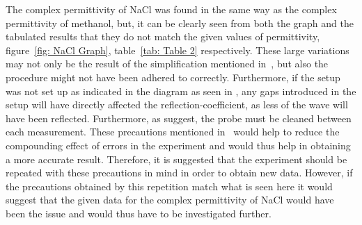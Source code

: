\documentclass[12pt, a4paper]{article}
\begin{document}
\begin{multicols*}{2}
The complex permittivity of NaCl was found in the same way as the complex permittivity of methanol, but, it can be clearly seen from both the graph and the tabulated results that they do not match the given values of permittivity, figure~\ref{fig: NaCl Graph}, table~\ref{tab: Table 2} respectively. These large variations may not only be the result of the simplification mentioned in~\cite{marsland1987dielectric}, but also the procedure might not have been adhered to correctly. Furthermore, if the setup was not set up as indicated in the diagram as seen in \cite{marsland1987dielectric}, any gaps introduced in the setup will have directly affected the reflection-coefficient, as less of the wave will have been reflected. Furthermore, as \cite{marsland1987dielectric} suggest, the probe must be cleaned between each measurement. These precautions mentioned in~\cite{marsland1987dielectric} would help to reduce the compounding effect of errors in the experiment and would thus help in obtaining a more accurate result. Therefore, it is suggested that the experiment should be repeated with these precautions in mind in order to obtain new data. However, if the precautions obtained by this repetition match what is seen here it would suggest that the given data for the complex permittivity of NaCl would have been the issue and would thus have to be investigated further.


\end{multicols*}
\end{document}
